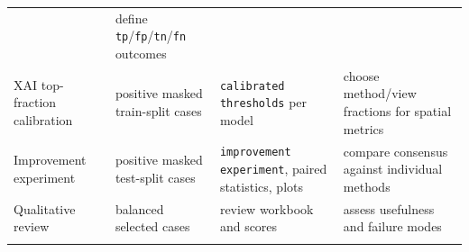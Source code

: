 \begin{longtable}[]{@{}llll@{}}
\begin{minipage}[t]{0.17\columnwidth}
	\end{minipage} & \begin{minipage}[t]{0.17\columnwidth}\raggedright
		define \texttt{tp}/\texttt{fp}/\texttt{tn}/\texttt{fn} outcomes\strut
	\end{minipage}\tabularnewline
	\begin{minipage}[t]{0.17\columnwidth}\raggedright
		XAI top-fraction calibration\strut
	\end{minipage} & \begin{minipage}[t]{0.17\columnwidth}\raggedright
		positive masked train-split cases\strut
	\end{minipage} & \begin{minipage}[t]{0.17\columnwidth}\raggedright
		\texttt{calibrated \allowbreak thresholds} per model\strut
	\end{minipage} & \begin{minipage}[t]{0.17\columnwidth}\raggedright
		choose method/view fractions for spatial metrics\strut
	\end{minipage} \tabularnewline
	\begin{minipage}[t]{0.17\columnwidth}\raggedright
		Improvement experiment\strut
	\end{minipage} & \begin{minipage}[t]{0.17\columnwidth}\raggedright
		positive masked test-split cases\strut
	\end{minipage} & \begin{minipage}[t]{0.17\columnwidth}\raggedright
		\texttt{improvement \allowbreak experiment}, paired statistics, plots\strut
	\end{minipage} & \begin{minipage}[t]{0.17\columnwidth}\raggedright
		compare consensus against individual methods\strut
	\end{minipage} \tabularnewline
	\begin{minipage}[t]{0.17\columnwidth}\raggedright
		Qualitative review\strut
	\end{minipage} & \begin{minipage}[t]{0.17\columnwidth}\raggedright
		balanced selected cases\strut
	\end{minipage} & \begin{minipage}[t]{0.17\columnwidth}\raggedright
		review workbook and scores\strut
	\end{minipage} & \begin{minipage}[t]{0.17\columnwidth}\raggedright
		assess usefulness and failure modes\strut
	\end{minipage} \tabularnewline
	\bottomrule
	\label{table:3-2}
\end{longtable}


